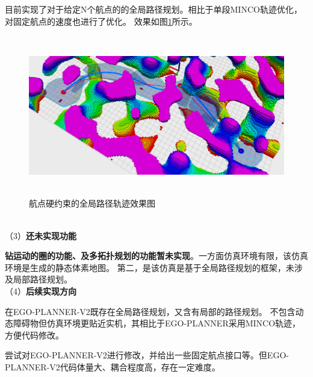     目前实现了对于给定N个航点的的全局路径规划。相比于单段MINCO轨迹优化，对固定航点的速度也进行了优化。
    效果如图\ref{image1}所示。
    \begin{figure}[htbp]
        \centering
        \includegraphics[width=16cm, height=7cm]{image/1.png}
        \caption{航点硬约束的全局路径轨迹效果图}\label{image1}
    \end{figure}\\
（3）\textbf{还未实现功能}


\textbf{钻运动的圈的功能、及多拓扑规划的功能暂未实现}。一方面仿真环境有限，该仿真环境是生成的静态体素地图。
第二，是该仿真是基于全局路径规划的框架，未涉及局部路径规划。\\
（4）\textbf{后续实现方向}


在EGO-PLANNER-V2既存在全局路径规划，又含有局部的路径规划。
不包含动态障碍物但仿真环境更贴近实机，其相比于EGO-PLANNER采用MINCO轨迹，方便代码修改。


尝试对EGO-PLANNER-V2进行修改，并给出一些固定航点接口等。但EGO-PLANNER-V2代码体量大、耦合程度高，存在一定难度。

